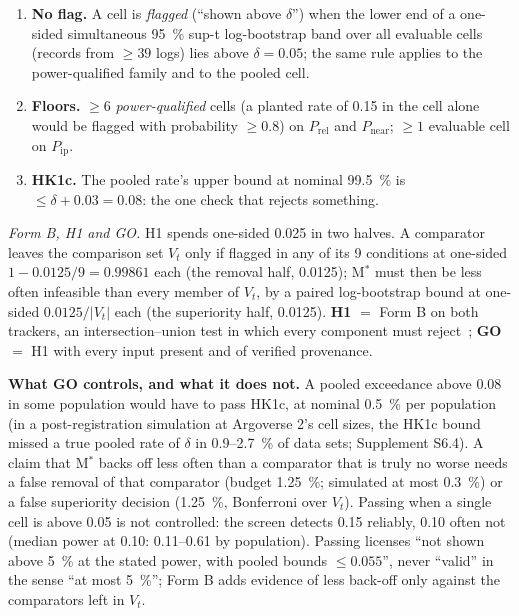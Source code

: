 \documentclass{ieeeaccess}
\begin{document}
\begin{enumerate}
\item[1.] \textbf{No flag.} A cell is \emph{flagged} (``shown above $\delta$'') when the lower end of a one-sided simultaneous 95~\% sup-t log-bootstrap band over all evaluable cells (records from $\geq 39$ logs) lies above $\delta = 0.05$; the same rule applies to the power-qualified family and to the pooled cell.
\item[2.] \textbf{Floors.} $\geq 6$ \emph{power-qualified} cells (a planted rate of 0.15 in the cell alone would be flagged with probability $\geq 0.8$) on $P_{\mathrm{rel}}$ and $P_{\mathrm{near}}$; $\geq 1$ evaluable cell on $P_{\mathrm{ip}}$.
\item[3.] \textbf{HK1c.} The pooled rate's upper bound at nominal 99.5~\% is $\leq \delta + 0.03 = 0.08$: the one check that rejects something.
\end{enumerate}

\emph{Form B, H1 and GO.} H1 spends one-sided 0.025 in two halves. A comparator leaves the comparison set $V_{t}$ only if flagged in any of its 9 conditions at one-sided $1 - 0.0125/9 = 0.99861$ each (the removal half, 0.0125); M$^{*}$ must then be less often infeasible than every member of $V_{t}$, by a paired log-bootstrap bound at one-sided $0.0125/|V_{t}|$ each (the superiority half, 0.0125). \textbf{H1} $=$ Form B on both trackers, an intersection--union test in which every component must reject~\cite{Berger1982}; \textbf{GO} $=$ H1 with every input present and of verified provenance.

\textbf{What GO controls, and what it does not.} A pooled exceedance above 0.08 in some population would have to pass HK1c, at nominal 0.5~\% per population (in a post-registration simulation at Argoverse 2's cell sizes, the HK1c bound missed a true pooled rate of $\delta$ in 0.9--2.7~\% of data sets; Supplement S6.4). A claim that M$^{*}$ backs off less often than a comparator that is truly no worse needs a false removal of that comparator (budget 1.25~\%; simulated at most 0.3~\%) or a false superiority decision (1.25~\%, Bonferroni over $V_{t}$). Passing when a single cell is above 0.05 is not controlled: the screen detects 0.15 reliably, 0.10 often not (median power at 0.10: 0.11--0.61 by population). Passing licenses ``not shown above 5~\% at the stated power, with pooled bounds $\leq 0.055$'', never ``valid'' in the sense ``at most 5~\%''; Form B adds evidence of less back-off only against the comparators left in $V_{t}$.
\end{document}
